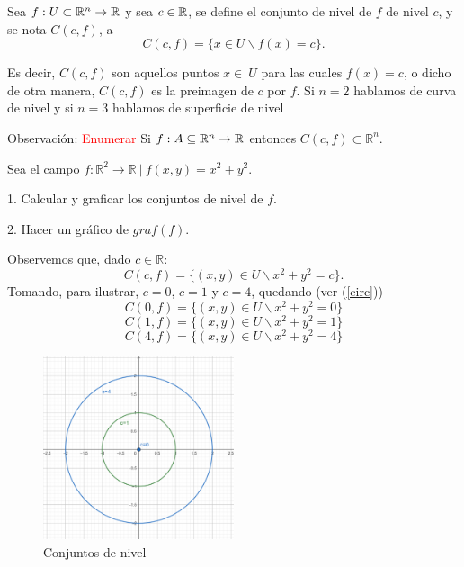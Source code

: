 
\begin{definition}  
\label{def:conjunto de nivel}
 \mbox{}
 
Sea $f: U\subset\mathbb{R}^n\rightarrow\mathbb{R}$ y sea $c \in \mathbb{R}$, se define  el conjunto de nivel de $f$ de nivel  $c$, y se nota $C(c,f)$,  a  
\[
C(c,f)=\{ x \in U \backslash f (x)=c \}.
 \]





Es decir,  $C(c,f)$ son aquellos puntos $x\in\ U$ para las cuales $f(x)=c$, o dicho de otra manera,  $C(c,f)$ es la preimagen de $c$ por $f$.   Si $n=2$ hablamos de curva de nivel  y si $n=3$  hablamos de superficie de nivel  

Observaci\'on: \textcolor{red}{Enumerar}   Si $f: A\subseteq\mathbb{R}^n\rightarrow\mathbb{R}$ entonces $C(c,f)  \subset \mathbb{R}^{n}.$



\begin{example}   Sea  el campo  $f: \mathbb{R}^{2} \rightarrow \mathbb{R} \:|\:  f(x,y)=x^2+y^2.$
\end{example}
1. Calcular y graficar los conjuntos de nivel de $f$.

2. Hacer un gr\'afico de  $graf(f)$.



Observemos que, dado $c \in \mathbb{R}$: 
 $$C(c,f)=\{(x,y) \in U \backslash   x^2+y^2  =c \}.$$
 Tomando, para ilustrar,  $c=0$, $c=1$ y $c=4$, quedando (ver (\ref{circ})) 
 \[
C(0,f)=\{(x,y) \in U \backslash x^2+y^2=0 \}
\]
 \[
C(1,f)=\{(x,y) \in U \backslash x^2+y^2=1 \}
\]
 \[
C(4,f)=\{(x,y) \in U \backslash x^2+y^2=4 \}
 \]

\begin{figure}[h!] %
    \centering
    \includegraphics[width=0.5\textwidth]{../figs/conjunto1_r.png} %
    \caption{Conjuntos de nivel}
    \label{fig:ejemplo} %
\end{figure}


\end{definition}
